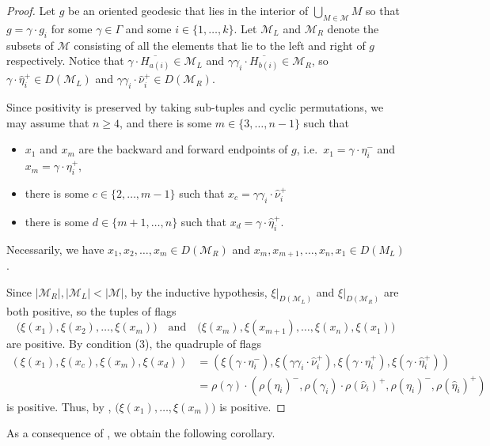 \documentclass{amsart}
\theoremstyle{plain}
\theoremstyle{definition}
\newcommand{\abs}[1]{\left|#1\right|}
\newcommand{\1}{\mathbf{1}}
\begin{document}
\begin{proof}
Let $g$ be an oriented geodesic that lies in the interior of $\bigcup_{M\in\mathcal M}M$ so that $g=\gamma\cdot g_i$ for some $\gamma\in\Gamma$ and some $i\in\{1,\dots,k\}$. Let $\mathcal M_L$ and $\mathcal M_R$ denote the subsets of $\mathcal M$ consisting of all the elements that lie to the left and right of $g$ respectively. Notice that $\gamma\cdot \overline{H_{a(i)}}\in\mathcal M_L$ and $\gamma\gamma_i\cdot\overline{H_{b(i)}}\in\mathcal M_R$, so $\gamma\cdot\hat\eta_i^+\in D(\mathcal M_L)$ and $\gamma\gamma_i\cdot\hat\nu_i^+\in D(\mathcal M_R)$. 

Since positivity is preserved by taking sub-tuples and cyclic permutations, we may assume that $n\ge 4$, and there is some $m\in\{3,\dots,n-1\}$ such that 
\begin{itemize}
    \item $x_1$ and $x_m$ are the backward and forward endpoints of $g$, i.e.\ $x_1=\gamma\cdot\eta_i^-$ and $x_m=\gamma\cdot\eta_i^+$, 
    \item there is some $c\in\{2,\dots,m-1\}$ such that 
    $x_c=
    \gamma\gamma_i\cdot\hat\nu_i^+$
    \item there is some $d\in\{m+1,\dots,n\}$ such that $x_d=
    \gamma\cdot\hat\eta_i^+$.
\end{itemize}
Necessarily, we have $x_1, x_2, \dots,x_m\in D(\mathcal M_R)$ and $x_m, x_{m+1}, \dots,x_n,x_1\in D(M_L)$.

Since $\abs{\mathcal M_R},\abs{\mathcal M_L}<\abs{\mathcal M}$, by the inductive hypothesis, $\xi|_{D(\mathcal M_L)}$ and $\xi|_{D(\mathcal M_R)}$ are both positive, so the tuples of flags
\[\big(\xi(x_1),\xi(x_2),\dots,\xi(x_m)\big)\quad\text{and}\quad\big(\xi(x_m), \xi(x_{m+1}),\dots,\xi(x_n),\xi(x_1)\big)\]
are positive. By condition (3), the quadruple of flags
\begin{align*}
    (\xi(x_1),\xi(x_c),\xi(x_m),\xi(x_d))&=(\xi(\gamma\cdot \eta_i^-),\xi(\gamma\gamma_i\cdot\hat\nu_i^+),\xi(\gamma\cdot \eta_i^+),\xi(\gamma\cdot\hat\eta_i^+))\\
&=\rho(\gamma)\cdot\left(\rho(\eta_i)^-,\rho(\gamma_i)\cdot \rho(\hat\nu_i)^+,\rho(\eta_i)^-,\rho(\hat\eta_i)^+\right)
\end{align*}
is positive. Thus, by , $\big(\xi(x_1),\dots,\xi(x_m)\big)$ is positive.
\end{proof}

As a consequence of , we obtain the following corollary.
\end{document}
